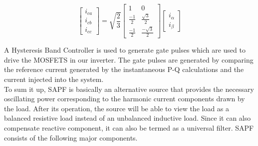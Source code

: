 \documentclass[journal,twoside]{IEEEtran}
\begin{document}
\[ \begin{bmatrix} i_{ca} \\ i_{cb} \\i_{cc} \end{bmatrix}
=\sqrt{\frac{2}{3}} \begin{bmatrix} 1 & 0\\ \frac{-1}{2} & \frac{\sqrt 3}{2}\\ \frac{-1}{2} & \frac{-\sqrt 3}{2} \end{bmatrix} \begin{bmatrix} i_{\alpha} \\ i_{\beta} \end{bmatrix} \] 

A Hysteresis Band Controller is used to generate gate
pulses which are used to drive the MOSFETS in our inverter.
The gate pulses are generated by comparing the reference
current generated by the instantaneous P-Q calculations and
the current injected into the system.\\
To sum it up, SAPF is basically an alternative source that
provides the necessary oscillating power corresponding to the
harmonic current components drawn by the load. After its
operation, the source will be able to view the load as a
balanced resistive load instead of an unbalanced inductive
load. Since it can also compensate reactive component, it can
also be termed as a universal filter. SAPF consists of the
following major components.
\end{document}
